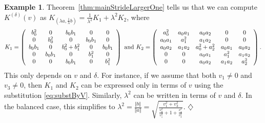 \documentclass[twoside]{article}
\theoremstyle{definition}
\newtheorem{example}[theorem]{Example}
\theoremstyle{remark}
\begin{document}
\begin{example}
Theorem~\ref{thm:mainStrideLargerOne} tells us that we can compute 
$K^{(\delta)}(v)$
as $K_{(\lambda a, \frac{1}{\lambda} b)} = \frac{1}{\lambda^2} K_1 + \lambda^2 K_2$, where
\begin{align*} %
    K_1 = \left( \begin{array}{c c c c c}
         b_0^2 & 0 & b_0b_1 & 0 & 0 \\
         0 & b_0^2 & 0 & b_0b_1 & 0 \\
         b_0b_1 & 0 & b_0^2 + b_1^2 & 0 & b_0b_1 \\
         0 & b_0b_1 & 0 & b_1^2 & 0 \\
         0 & 0 & b_0b_1 & 0 & b_1^2
    \end{array} \right)
    \text{ and }
    K_2 = \left( \begin{array}{c c c c c}
         a_0^2 & a_0a_1 & a_0a_2 & 0 & 0 \\
         a_0a_1 & a_1^2 & a_1a_2 & 0 & 0 \\
         a_0a_2 & a_1a_2 & a_0^2 + a_2^2 & a_0a_1 & a_0a_2 \\
         0 & 0 & a_0a_1 & a_1^2 & a_1a_2 \\
         0 & 0 & a_0a_2 & a_1a_2 & a_2^2
    \end{array} \right).
\end{align*}
This only depends on $v$ and $\delta$.
For instance, if we assume that both $v_1\neq 0$ and $v_3\neq 0$, then $K_1$ and $K_2$ can be expressed only in terms of $v$ using the substitution \eqref{eq:substByV}.
Similarly, $\lambda^2$ can be written in terms of $v$ and $\delta$.
In the balanced case, this simplifies to 
$\lambda^2 = \frac{\Vert b \Vert}{\Vert a \Vert} = \sqrt{\frac{v_1^2+v_3^2}{ \frac{v_0^2}{v_1^2} + 1 + \frac{v_4^2}{v_3^2} }}$.
$\hfill \diamondsuit$
\end{example}
\end{document}
